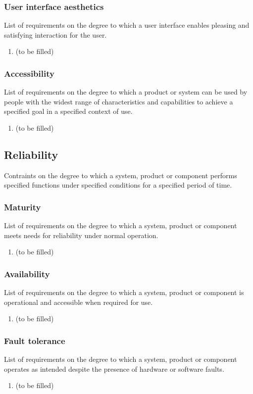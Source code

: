 \subsubsection{User interface aesthetics}
List of requirements on the degree to which a user interface enables pleasing and satisfying interaction for the user.
\begin{enumerate}
\item (to be filled)
\end{enumerate}
\subsubsection{Accessibility}
List of requirements on the degree to which a product or system can be used by people with the widest range of characteristics and capabilities to achieve a specified goal in a specified context of use.
\begin{enumerate}
\item (to be filled)
\end{enumerate}


\subsection{Reliability}
Contraints on the degree to which a system, product or component performs specified functions under specified conditions for a specified period of time.
\subsubsection{Maturity}
List of requirements on the degree to which a system, product or component meets needs for reliability under normal operation.
\begin{enumerate}
\item (to be filled)
\end{enumerate}
\subsubsection{Availability}
List of requirements on the degree to which a system, product or component is operational and accessible when required for use.
\begin{enumerate}
\item (to be filled)
\end{enumerate}
\subsubsection{Fault tolerance}
List of requirements on the degree to which a system, product or component operates as intended despite the presence of hardware or software faults.
\begin{enumerate}
\item (to be filled)
\end{enumerate}
